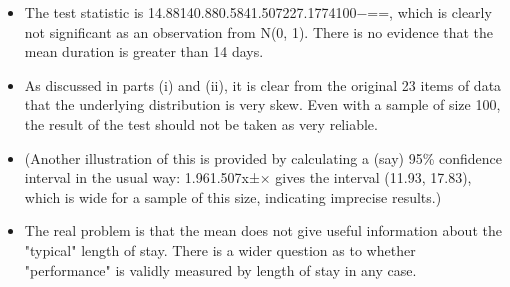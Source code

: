 \documentclass[a4paper,12pt]{article}
\begin{document}
\begin{enumerate}
\begin{itemize}
\item The test statistic is 14.88140.880.5841.507227.1774100−==, which is clearly not significant as an observation from N(0, 1). There is no evidence that the mean duration is greater than 14 days.
\item As discussed in parts (i) and (ii), it is clear from the original 23 items of data that the underlying distribution is very skew. Even with a sample of size 100, the result of the test should not be taken as very reliable. 
\item (Another illustration of this is provided by calculating a (say) 95\% confidence interval in the usual way: 1.961.507x±× gives the interval (11.93, 17.83), which is wide for a sample of this size, indicating imprecise results.) 
\item The real problem is that the mean does not give useful information about the "typical" length of stay. There is a wider question as to whether "performance" is validly measured by length of stay in any case.
\end{itemize}

\end{enumerate}
\end{document}

